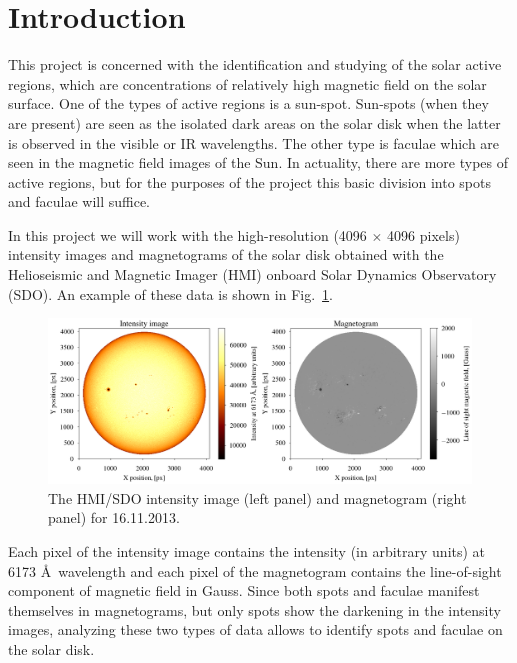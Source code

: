 \documentclass[paper=a4, fontsize=11pt]{article}
\numberwithin{equation}{section}
\numberwithin{figure}{section}
\numberwithin{table}{section}
\begin{document}
\setcounter{section}{0}
\section{Introduction}
This project is concerned with the identification and studying of the solar active regions,
which are concentrations of relatively high magnetic field on the solar surface.
One of the types of active regions is a sun-spot.
Sun-spots (when they are present) are seen as the isolated dark areas on the solar disk when the latter
is observed in the visible or IR wavelengths.
The other type is faculae which are seen in the magnetic field images of the Sun.
In actuality, there are more types of active regions, but for the purposes of the project this basic
division into spots and faculae will suffice.

In this project we will work with the high-resolution (4096 $\times$ 4096 pixels) intensity images and magnetograms 
of the solar disk obtained with the Helioseismic and Magnetic Imager (HMI) onboard Solar Dynamics Observatory (SDO).
An example of these data is shown in Fig.~\ref{fig:sdo_img}.
\begin{figure}[h!]
\centering
\includegraphics[scale=0.495]{sdo_img}
\caption[]{The HMI/SDO intensity image (left panel) and magnetogram (right panel) for 16.11.2013.}
\label{fig:sdo_img}
\end{figure}
Each pixel of the intensity image contains the intensity (in arbitrary units) at 6173 \AA\ wavelength and
each pixel of the magnetogram contains the line-of-sight component of magnetic field in Gauss.
Since both spots and faculae manifest themselves in magnetograms, but only spots show the darkening in the intensity
images, analyzing these two types of data allows to identify spots and faculae on the solar disk.
\end{document}
